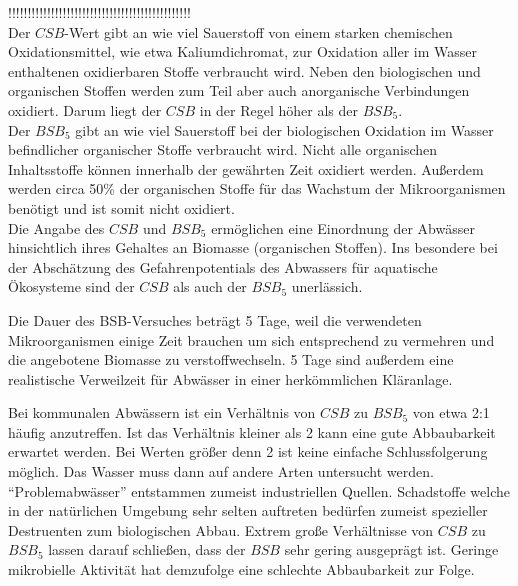 !!!!!!!!!!!!!!!!!!!!!!!!!!!!!!!!!!!!!!!!!!!!!!!\\


Der $CSB$-Wert gibt an wie viel Sauerstoff von einem  starken chemischen Oxidationsmittel, wie etwa Kaliumdichromat, zur Oxidation aller im Wasser enthaltenen oxidierbaren Stoffe verbraucht wird. Neben den biologischen und organischen Stoffen werden zum Teil aber auch anorganische Verbindungen oxidiert. Darum liegt der $CSB$ in der Regel höher als der $BSB_5$.\\
Der $BSB_5$ gibt an wie viel Sauerstoff bei der biologischen Oxidation im Wasser befindlicher organischer Stoffe verbraucht wird. Nicht alle organischen Inhaltsstoffe können innerhalb der gewährten Zeit oxidiert werden. Außerdem werden circa 50\% der organischen Stoffe für das Wachstum der Mikroorganismen benötigt und ist somit nicht oxidiert.\cite[S.64]{rosenwinkelAnaerobtechnikAbwasserSchlamm2015} \\
Die Angabe des $CSB$ und $BSB_5$ ermöglichen eine Einordnung der Abwässer hinsichtlich ihres Gehaltes an Biomasse (organischen Stoffen). Ins besondere bei der Abschätzung des Gefahrenpotentials des Abwassers für aquatische Ökosysteme sind der $CSB$ als auch der $BSB_5$ unerlässich.

 
Die Dauer des BSB-Versuches beträgt 5 Tage, weil die verwendeten Mikroorganismen einige Zeit brauchen um sich entsprechend zu vermehren und die angebotene Biomasse zu verstoffwechseln. 5 Tage sind außerdem eine realistische Verweilzeit für Abwässer in einer herkömmlichen Kläranlage.


Bei kommunalen Abwässern ist ein Verhältnis von $CSB$ zu $BSB_5$ von etwa 2:1 häufig anzutreffen. 
Ist das Verhältnis kleiner als 2 kann eine gute Abbaubarkeit erwartet werden. Bei Werten größer denn 2 ist keine einfache Schlussfolgerung möglich. Das Wasser muss dann auf andere Arten untersucht werden. "`Problemabwässer"' entstammen zumeist industriellen Quellen. Schadstoffe welche in der natürlichen Umgebung sehr  selten auftreten bedürfen zumeist spezieller Destruenten zum biologischen Abbau. Extrem große Verhältnisse von $CSB$ zu $BSB_5$ lassen darauf schließen, dass der $BSB$ sehr gering ausgeprägt ist. Geringe mikrobielle Aktivität hat demzufolge eine schlechte Abbaubarkeit zur Folge.\cite[S.64]{rosenwinkelAnaerobtechnikAbwasserSchlamm2015}\\



